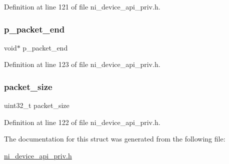 Definition at line 121 of file ni\+\_\+device\+\_\+api\+\_\+priv.\+h.

\mbox{\label{struct__ni__encoder__packet_aba52d034bd80dab3938bb013df031c25}} 
\subsubsection{\texorpdfstring{p\_packet\_end}{p\_packet\_end}}
{\footnotesize\ttfamily void$\ast$ p\+\_\+packet\+\_\+end}



Definition at line 123 of file ni\+\_\+device\+\_\+api\+\_\+priv.\+h.

\mbox{\label{struct__ni__encoder__packet_a09f4c6f4095f89f83910575805e57368}} 
\subsubsection{\texorpdfstring{packet\_size}{packet\_size}}
{\footnotesize\ttfamily uint32\+\_\+t packet\+\_\+size}



Definition at line 122 of file ni\+\_\+device\+\_\+api\+\_\+priv.\+h.



The documentation for this struct was generated from the following file\+:\begin{DoxyCompactItemize}
\item 
\mbox{\hyperlink{ni__device__api__priv_8h}{ni\+\_\+device\+\_\+api\+\_\+priv.\+h}}\end{DoxyCompactItemize}
